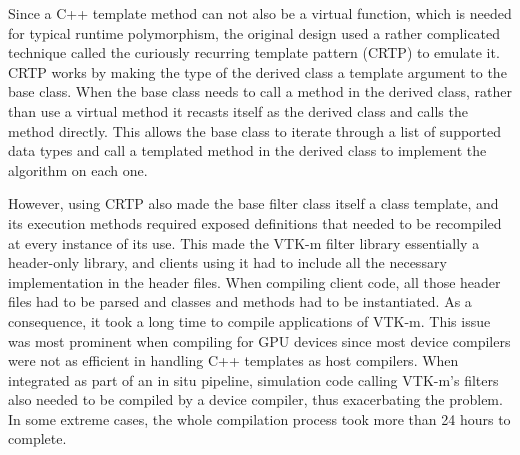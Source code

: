 Since a C++ template method can not also be a virtual function, which is needed for typical runtime polymorphism, the original design used a rather complicated technique called the curiously recurring template pattern (CRTP) \cite{Coplien1995} to emulate it.
CRTP works by making the type of the derived class a template argument to the base class.
When the base class needs to call a method in the derived class, rather than use a virtual method it recasts itself as the derived class and calls the method directly.
This allows the base class to iterate through a list of supported data types and call a templated method in the derived class to implement the algorithm on each one.


However, using CRTP also made the base filter class itself a class template, and its execution methods required exposed definitions that needed to be recompiled at every instance of its use.
This made the VTK-m filter library essentially a header-only library, and clients using it had to include all the necessary implementation in the header files.
When compiling client code, all those header files had to be parsed and classes and methods had to be instantiated.
As a consequence, it took a long time to compile applications of VTK-m.
This issue was most prominent when compiling for GPU devices since most device compilers were not as efficient in handling C++ templates as host compilers.
When integrated as part of an in situ pipeline, simulation code calling VTK-m's filters also needed to be compiled by a device compiler, thus exacerbating the problem.
In some extreme cases, the whole compilation process took more than 24 hours to complete.

